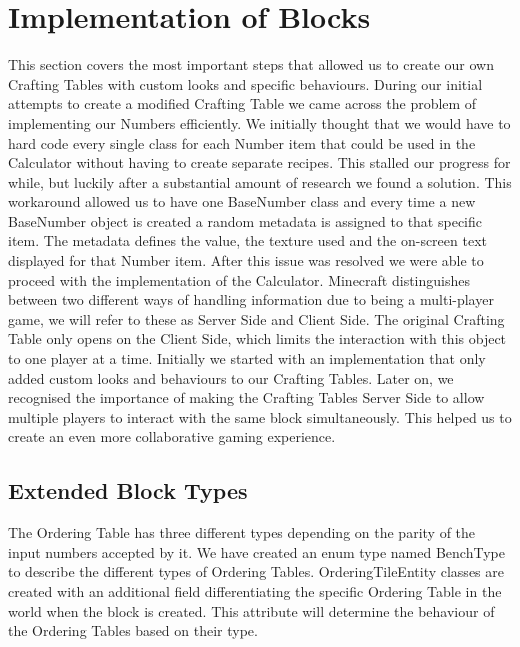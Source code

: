 \section{Implementation of Blocks}
This section covers the most important steps that allowed us to create our own Crafting Tables with custom looks and specific behaviours.\newline\newline
During our initial attempts to create a modified Crafting Table we came across the problem of implementing our Numbers efficiently. We initially thought that we would have to hard code every single class for each Number item that could be used in the Calculator without having to create separate recipes. This stalled our progress for while, but luckily after a substantial amount of research we found a solution. This workaround allowed us to have one BaseNumber class and every time a new BaseNumber object is created a random metadata is assigned to that specific item. The metadata defines the value, the texture used and the on-screen text displayed for that Number item. After this issue was resolved we were able to proceed with the implementation of the Calculator.\newline\newline
Minecraft distinguishes between two different ways of handling information due to being a multi-player game, we will refer to these as Server Side and Client Side. The original Crafting Table only opens on the Client Side, which limits the interaction with this object to one player at a time. Initially we started with an implementation that only added custom looks and behaviours to our Crafting Tables. Later on, we recognised the importance of making the Crafting Tables Server Side to allow multiple players to interact with the same block simultaneously. This helped us to create an even more collaborative gaming experience.

\subsection{Extended Block Types}
The Ordering Table has three different types depending on the parity of the input numbers accepted by it. We have created an enum type named BenchType to describe the different types of Ordering Tables. OrderingTileEntity classes are created with an additional field differentiating the specific Ordering Table in the world when the block is created. This attribute will determine the behaviour of the Ordering Tables based on their type.

